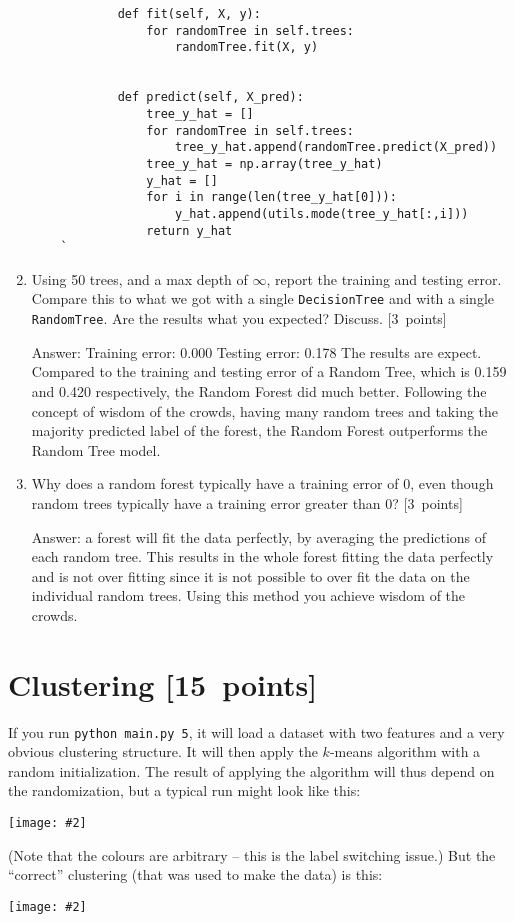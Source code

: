 \documentclass{article}
\newcommand{\blu}[1]{{\textcolor{blu}{#1}}}
\newcommand{\gre}[1]{\textcolor{gre}{#1}}
\newcommand\ans[1]{\par\gre{Answer: #1}}
\let\ask\blu
\newcommand\pts[1]{\textcolor{pointscolour}{[#1~points]}}
\newcommand{\centerfig}[2]{\begin{center}\texttt{[image: \#2]}\end{center}}
\begin{document}
\begin{enumerate}
\begin{verbatim}
            def fit(self, X, y):
                for randomTree in self.trees:
                    randomTree.fit(X, y)
        

            def predict(self, X_pred):
                tree_y_hat = []
                for randomTree in self.trees:
                    tree_y_hat.append(randomTree.predict(X_pred))
                tree_y_hat = np.array(tree_y_hat)
                y_hat = []
                for i in range(len(tree_y_hat[0])):
                    y_hat.append(utils.mode(tree_y_hat[:,i]))
                return y_hat
    `   \end{verbatim}
        
        \item Using 50 trees, and a max depth of $\infty$, \ask{report the training and testing error}. Compare this to what we got with a single \texttt{DecisionTree} and with a single \texttt{RandomTree}. \ask{Are the results what you expected? Discuss.} \pts{3}
        
        \ans{\newline Training error: 0.000 \newline Testing error: 0.178 \newline The results are expect. Compared to the training and testing error of a Random Tree, which is 0.159 and 0.420 respectively, the Random Forest did much better. Following the concept of wisdom of the crowds, having many random trees and taking the majority predicted label of the forest, the Random Forest outperforms the Random Tree model.}
        \item \ask{Why does a random forest typically have a training error of 0, even though random trees typically have a training error greater than 0?} \pts{3}

        \ans{ a forest will fit the data perfectly, by averaging the predictions of each random tree. This results in the whole forest fitting the data perfectly and is not over fitting since it is not possible to over fit the data on the individual random trees. Using this method you achieve wisdom of the crowds.}
    \end{enumerate}


    \clearpage
    \section{Clustering \pts{15}}

    If you run \verb|python main.py 5|, it will load a dataset with two features
    and a very obvious clustering structure. It will then apply the $k$-means algorithm
    with a random initialization. The result of applying the
    algorithm will thus depend on the randomization, but a typical run might look like this:
    \centerfig{.5}{figs/kmeans_basic.png}
    (Note that the colours are arbitrary -- this is the label switching issue.)
    But the ``correct'' clustering (that was used to make the data) is this:
    \centerfig{.5}{figs/kmeans_good.png}
\end{document}
